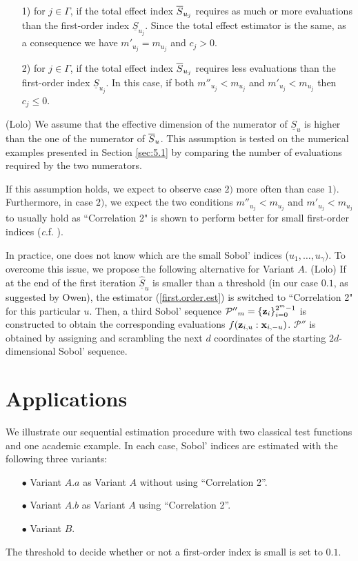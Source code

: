 \begin{itemize}
\item[1)] for $j \in \Gamma$, if the total effect index $\ov{$S$}_{u_j}$ requires as much or more evaluations than the first-order index $\underline{S}_{u_j}$. Since the total effect estimator is the same, as a consequence we have $m'_{u_j}=m_{u_j}$ and $c_j >0$.
\item[2)] for $j \in \Gamma$, if the total effect index $\ov{$S$}_{u_j}$ requires less evaluations than the first-order index $\underline{S}_{u_j}$. In this case, if both $m''_{u_j} < m_{u_j}$ and $m'_{u_j} < m_{u_j}$ then $c_j \leq 0$.  
\end{itemize}
{\color{purple}(Lolo) We assume that the effective dimension of the numerator of $\underline{S}_u$ is higher than the one of the numerator of $\ov{$S$}_u$. This assumption is tested on the numerical examples presented in Section \ref{sec:5.1} by comparing the number of evaluations required by the two numerators. 

If this assumption holds, we expect to observe case $2)$ more often than case $1)$. Furthermore, in case $2)$, we expect the two conditions $m''_{u_j} < m_{u_j}$ and $m'_{u_j} < m_{u_j}$ to usually hold as ``Correlation 2" is shown to perform better for small first-order indices (\textit c.f. \cite{Owen}).}
\bigskip

In practice, one does not know which are the small Sobol' indices ($u_1,\dots,u_\gamma)$. To overcome this issue, we propose the following alternative for Variant $A$. {\color{purple}(Lolo) If at the end of the first iteration $\widehat{\underline{S}}_u$ is smaller than a threshold (in our case $0.1$, as suggested by Owen), the estimator (\ref{first.order.est}) is switched to ``Correlation 2" for this particular $u$. Then, a third Sobol' sequence $\mathcal{P''}_{m}=\{\boldsymbol{\mathbf{z}}_i\}_{i=0}^{2^m-1}$ is constructed to obtain the corresponding evaluations $f({\boldsymbol{\mathbf{z}}}_{i,u}:{\boldsymbol{\mathbf{x}}}_{i,-u})$. $\mathcal{P''}$ is obtained by assigning and scrambling the next $d$ coordinates of the starting $2d$-dimensional Sobol' sequence.}

\section{Applications}
\label{sec:5}

We illustrate our sequential estimation procedure with two classical test functions and one academic example. In each case, Sobol' indices are estimated with the following three variants:
\begin{itemize}
\item[$\bullet$] Variant $A.a$ as Variant $A$ without using ``Correlation 2''. 
\item[$\bullet$] Variant $A.b$ as Variant $A$ using ``Correlation 2''.
\item[$\bullet$] Variant $B$.
\end{itemize}
The threshold to decide whether or not a first-order index is small is set to $0.1$. 

